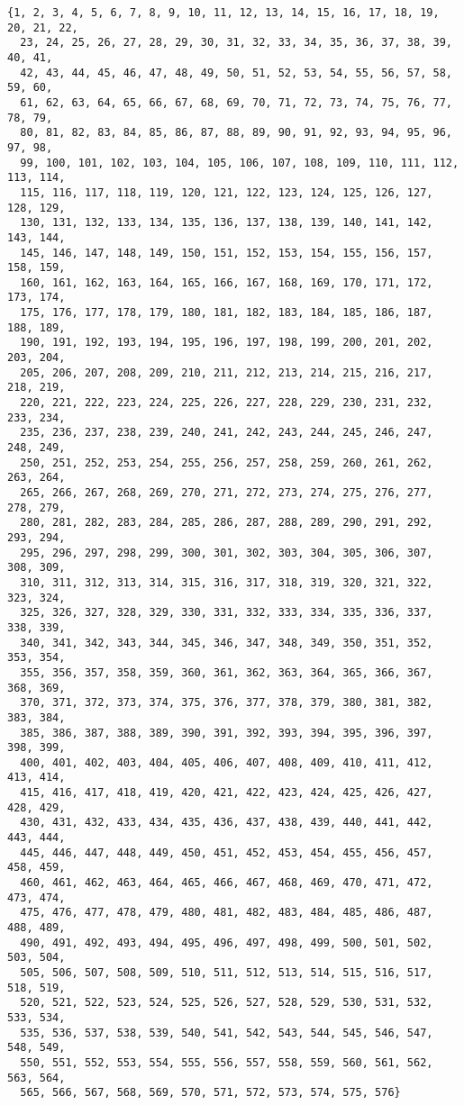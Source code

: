 \documentclass[
  letterpaper,
  DIV=11,
  numbers=noendperiod]{scrreprt}
\begin{document}
\begin{verbatim}
{1, 2, 3, 4, 5, 6, 7, 8, 9, 10, 11, 12, 13, 14, 15, 16, 17, 18, 19, 20, 21, 22,
  23, 24, 25, 26, 27, 28, 29, 30, 31, 32, 33, 34, 35, 36, 37, 38, 39, 40, 41,
  42, 43, 44, 45, 46, 47, 48, 49, 50, 51, 52, 53, 54, 55, 56, 57, 58, 59, 60,
  61, 62, 63, 64, 65, 66, 67, 68, 69, 70, 71, 72, 73, 74, 75, 76, 77, 78, 79,
  80, 81, 82, 83, 84, 85, 86, 87, 88, 89, 90, 91, 92, 93, 94, 95, 96, 97, 98,
  99, 100, 101, 102, 103, 104, 105, 106, 107, 108, 109, 110, 111, 112, 113, 114,
  115, 116, 117, 118, 119, 120, 121, 122, 123, 124, 125, 126, 127, 128, 129,
  130, 131, 132, 133, 134, 135, 136, 137, 138, 139, 140, 141, 142, 143, 144,
  145, 146, 147, 148, 149, 150, 151, 152, 153, 154, 155, 156, 157, 158, 159,
  160, 161, 162, 163, 164, 165, 166, 167, 168, 169, 170, 171, 172, 173, 174,
  175, 176, 177, 178, 179, 180, 181, 182, 183, 184, 185, 186, 187, 188, 189,
  190, 191, 192, 193, 194, 195, 196, 197, 198, 199, 200, 201, 202, 203, 204,
  205, 206, 207, 208, 209, 210, 211, 212, 213, 214, 215, 216, 217, 218, 219,
  220, 221, 222, 223, 224, 225, 226, 227, 228, 229, 230, 231, 232, 233, 234,
  235, 236, 237, 238, 239, 240, 241, 242, 243, 244, 245, 246, 247, 248, 249,
  250, 251, 252, 253, 254, 255, 256, 257, 258, 259, 260, 261, 262, 263, 264,
  265, 266, 267, 268, 269, 270, 271, 272, 273, 274, 275, 276, 277, 278, 279,
  280, 281, 282, 283, 284, 285, 286, 287, 288, 289, 290, 291, 292, 293, 294,
  295, 296, 297, 298, 299, 300, 301, 302, 303, 304, 305, 306, 307, 308, 309,
  310, 311, 312, 313, 314, 315, 316, 317, 318, 319, 320, 321, 322, 323, 324,
  325, 326, 327, 328, 329, 330, 331, 332, 333, 334, 335, 336, 337, 338, 339,
  340, 341, 342, 343, 344, 345, 346, 347, 348, 349, 350, 351, 352, 353, 354,
  355, 356, 357, 358, 359, 360, 361, 362, 363, 364, 365, 366, 367, 368, 369,
  370, 371, 372, 373, 374, 375, 376, 377, 378, 379, 380, 381, 382, 383, 384,
  385, 386, 387, 388, 389, 390, 391, 392, 393, 394, 395, 396, 397, 398, 399,
  400, 401, 402, 403, 404, 405, 406, 407, 408, 409, 410, 411, 412, 413, 414,
  415, 416, 417, 418, 419, 420, 421, 422, 423, 424, 425, 426, 427, 428, 429,
  430, 431, 432, 433, 434, 435, 436, 437, 438, 439, 440, 441, 442, 443, 444,
  445, 446, 447, 448, 449, 450, 451, 452, 453, 454, 455, 456, 457, 458, 459,
  460, 461, 462, 463, 464, 465, 466, 467, 468, 469, 470, 471, 472, 473, 474,
  475, 476, 477, 478, 479, 480, 481, 482, 483, 484, 485, 486, 487, 488, 489,
  490, 491, 492, 493, 494, 495, 496, 497, 498, 499, 500, 501, 502, 503, 504,
  505, 506, 507, 508, 509, 510, 511, 512, 513, 514, 515, 516, 517, 518, 519,
  520, 521, 522, 523, 524, 525, 526, 527, 528, 529, 530, 531, 532, 533, 534,
  535, 536, 537, 538, 539, 540, 541, 542, 543, 544, 545, 546, 547, 548, 549,
  550, 551, 552, 553, 554, 555, 556, 557, 558, 559, 560, 561, 562, 563, 564,
  565, 566, 567, 568, 569, 570, 571, 572, 573, 574, 575, 576}
\end{verbatim}
\end{document}
